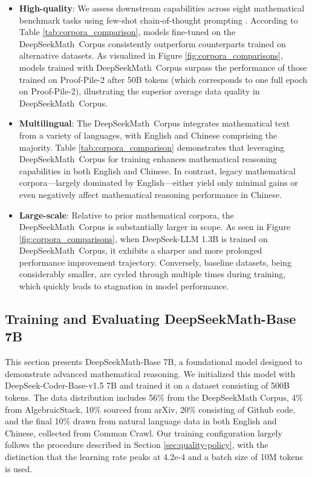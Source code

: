 \begin{itemize}[topsep=0pt]
    \item \textbf{High-quality}:
    We assess downstream capabilities across eight mathematical benchmark tasks using few-shot chain-of-thought prompting \cite{cot}. According to Table \ref{tab:corpora_comparison}, models fine-tuned on the DeepSeekMath~Corpus consistently outperform counterparts trained on alternative datasets. As visualized in Figure \ref{fig:corpora_comparisons}, models trained with DeepSeekMath~Corpus surpass the performance of those trained on Proof-Pile-2 after 50B tokens (which corresponds to one full epoch on Proof-Pile-2), illustrating the superior average data quality in DeepSeekMath~Corpus.
    \item \textbf{Multilingual}:
    The DeepSeekMath~Corpus integrates mathematical text from a variety of languages, with English and Chinese comprising the majority. Table \ref{tab:corpora_comparison} demonstrates that leveraging DeepSeekMath~Corpus for training enhances mathematical reasoning capabilities in both English and Chinese. In contrast, legacy mathematical corpora—largely dominated by English—either yield only minimal gains or even negatively affect mathematical reasoning performance in Chinese.
    \item \textbf{Large-scale}:
    Relative to prior mathematical corpora, the DeepSeekMath~Corpus is substantially larger in scope. As seen in Figure \ref{fig:corpora_comparisons}, when DeepSeek-LLM 1.3B is trained on DeepSeekMath~Corpus, it exhibits a sharper and more prolonged performance improvement trajectory. Conversely, baseline datasets, being considerably smaller, are cycled through multiple times during training, which quickly leads to stagnation in model performance.
\end{itemize}

\subsection{Training and Evaluating DeepSeekMath-Base 7B}

This section presents DeepSeekMath-Base 7B, a foundational model designed to demonstrate advanced mathematical reasoning. We initialized this model with DeepSeek-Coder-Base-v1.5 7B \citep{deepseek-coder} and trained it on a dataset consisting of 500B tokens. The data distribution includes 56\% from the DeepSeekMath Corpus, 4\% from AlgebraicStack, 10\% sourced from arXiv, 20\% consisting of Github code, and the final 10\% drawn from natural language data in both English and Chinese, collected from Common Crawl. Our training configuration largely follows the procedure described in Section \ref{sec:quality-policy}, with the distinction that the learning rate peaks at 4.2e-4 and a batch size of 10M tokens is used.

